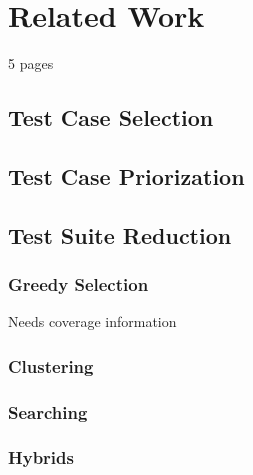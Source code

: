 
\chapter{Related Work}\label{chapter:related}

5 pages

\section{Test Case Selection}

\section{Test Case Priorization}

\section{Test Suite Reduction}

\subsection{Greedy Selection}

Needs coverage information

\subsection{Clustering}

\subsection{Searching}

\subsection{Hybrids}
